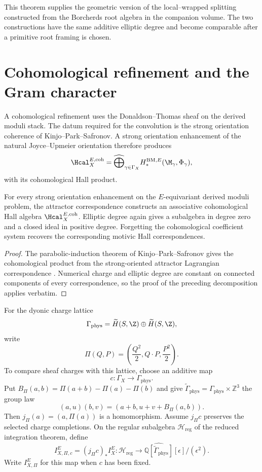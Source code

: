 This theorem supplies the geometric version of the local--wrapped splitting constructed from the Borcherds root algebra in the companion volume.  The two constructions have the same additive elliptic degree and become comparable after a primitive root framing is chosen.

\chapter{Cohomological refinement and the Gram character}
A cohomological refinement uses the Donaldson--Thomas sheaf on the derived moduli stack.  The datum required for the convolution is the strong orientation coherence of Kinjo--Park--Safronov.  A strong orientation enhancement of the natural Joyce--Upmeier orientation therefore produces
\[
 \Hcal_X^{E,\mathrm{coh}}
 =\widehat\bigoplus_{\gamma\in\Gamma_X}
 H_*^{\mathrm{BM},E}(\M_\gamma,\Phi_\gamma),
\]
with its cohomological Hall product.

\begin{theorem}
For every strong orientation enhancement on the $E$-equivariant derived moduli problem, the attractor correspondence constructs an associative cohomological Hall algebra $\Hcal_X^{E,\mathrm{coh}}$.  Elliptic degree again gives a subalgebra in degree zero and a closed ideal in positive degree.  Forgetting the cohomological coefficient system recovers the corresponding motivic Hall correspondences.
\end{theorem}
\begin{proof}
The parabolic-induction theorem of Kinjo--Park--Safronov gives the cohomological product from the strong-oriented attractor Lagrangian correspondence \cite{KPS}.  Numerical charge and elliptic degree are constant on connected components of every correspondence, so the proof of the preceding decomposition applies verbatim.
\end{proof}

For the dyonic charge lattice
\[
 \Gamma_{\mathrm{phys}}
 =\widetilde H(S,\Z)\oplus\widetilde H(S,\Z),
\]
write
\[
 \Pi(Q,P)=\left(\frac{Q^2}{2},Q\cdot P,\frac{P^2}{2}\right).
\]
To compare sheaf charges with this lattice, choose an additive map
\[
 c:\Gamma_X\longrightarrow\Gamma_{\mathrm{phys}}.
\]
Put $B_\Pi(a,b)=\Pi(a+b)-\Pi(a)-\Pi(b)$ and give
$\widetilde\Gamma_{\mathrm{phys}}=\Gamma_{\mathrm{phys}}\times\mathbb Z^3$
the group law
\[
 (a,u)(b,v)=(a+b,u+v+B_\Pi(a,b)).
\]
Then $j_\Pi(a)=(a,\Pi(a))$ is a homomorphism.
Assume $j_\Pi c$ preserves the selected charge completions.
On the regular subalgebra $\mathcal H_{\mathrm{reg}}$ of the reduced
integration theorem, define
\[
 I_{X,\Pi,c}^E=(j_\Pi c)_*I_X^E:
 \mathcal H_{\mathrm{reg}}\longrightarrow
 \widehat{\mathbb Q[\widetilde\Gamma_{\mathrm{phys}}]}
 [\epsilon]/(\epsilon^2).
\]
Write $I_{X,\Pi}^E$ for this map when $c$ has been fixed.

